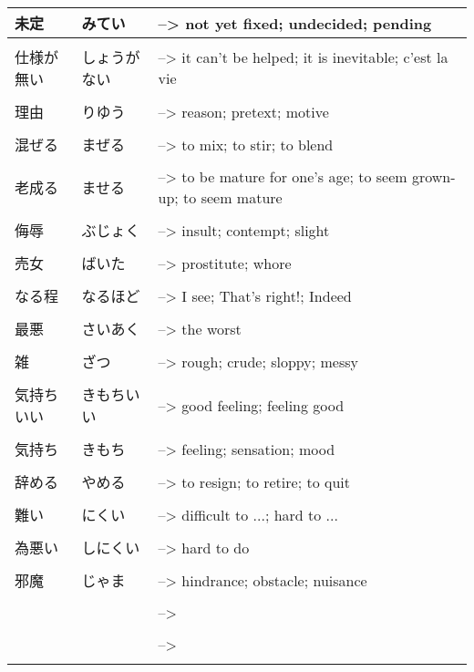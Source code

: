 \documentclass{article}
\begin{document}
\begin{tabular}{ l | l l }
未定    &みてい   &--> not yet fixed; undecided; pending   \\ \hline\\[-1em]
仕様が無い    &しょうがない   &--> it can't be helped; it is inevitable; c'est la vie   \\ \hline\\[-1em]
理由    &りゆう   &--> reason; pretext; motive   \\ \hline\\[-1em]
混ぜる    &まぜる   &--> to mix; to stir; to blend   \\ \hline\\[-1em]
老成る    &ませる   &--> to be mature for one's age; to seem grown-up; to seem mature   \\ \hline\\[-1em]
侮辱    &ぶじょく    &--> insult; contempt; slight   \\ \hline\\[-1em]
売女    &ばいた   &--> prostitute; whore   \\ \hline\\[-1em]
なる程    &なるほど   &--> I see; That's right!; Indeed   \\ \hline\\[-1em]
最悪    &さいあく   &--> the worst   \\ \hline\\[-1em]
雑    &ざつ   &--> rough; crude; sloppy; messy   \\ \hline\\[-1em]
気持ちいい    &きもちいい   &--> good feeling; feeling good   \\ \hline\\[-1em]
気持ち     &きもち   &--> feeling; sensation; mood   \\ \hline\\[-1em]
辞める     &やめる   &--> to resign; to retire; to quit   \\ \hline\\[-1em]
難い     &にくい   &--> difficult to ...; hard to ...   \\ \hline\\[-1em]
為悪い     &しにくい   &--> hard to do   \\ \hline\\[-1em]
邪魔    &じゃま   &--> hindrance; obstacle; nuisance   \\ \hline\\[-1em]
    &   &-->    \\ \hline\\[-1em]
    &   &-->    \\ \hline\\[-1em]
\end{tabular} \\
\end{document}
